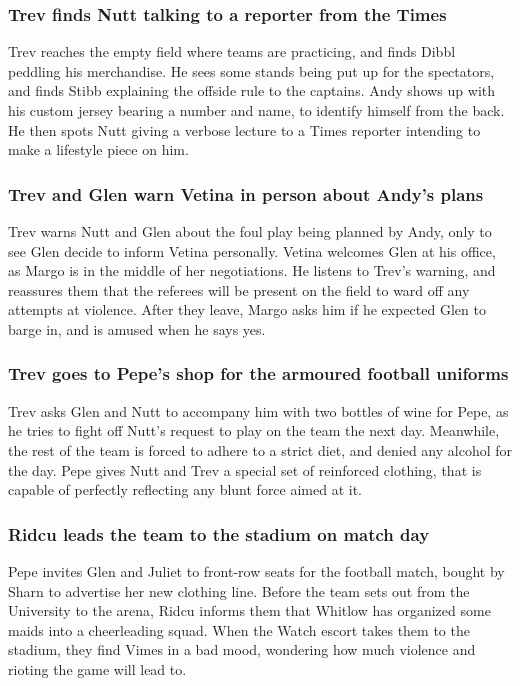 \subsubsection{\Gls{Trev} finds \Gls{Nutt} talking to a reporter from the Times}
\Gls{Trev} reaches the empty field where teams are practicing, and finds \Gls{Dibbl} peddling his
merchandise. He sees some stands being put up for the spectators, and finds \Gls{Stibb} explaining
the offside rule to the captains. \Gls{Andy} shows up with his custom jersey bearing a number and
name, to identify himself from the back. He then spots \Gls{Nutt} giving a verbose lecture to a
Times reporter intending to make a lifestyle piece on him.

\subsubsection{\Gls{Trev} and \Gls{Glen} warn \Gls{Vetina} in person about \Gls{Andy}'s plans}
\Gls{Trev} warns \Gls{Nutt} and \Gls{Glen} about the foul play being planned by \Gls{Andy}, only
to see \Gls{Glen} decide to inform \Gls{Vetina} personally. \Gls{Vetina} welcomes \Gls{Glen} at his
office, as \Gls{Margo} is in the middle of her negotiations. He listens to \Gls{Trev}'s warning, and
reassures them that the referees will be present on the field to ward off any attempts at violence.
After they leave, \Gls{Margo} asks him if he expected \Gls{Glen} to barge in, and is amused when he
says yes.

\subsubsection{\Gls{Trev} goes to \Gls{Pepe}'s shop for the armoured football uniforms}
\Gls{Trev} asks \Gls{Glen} and \Gls{Nutt} to accompany him with two bottles of wine for \Gls{Pepe},
as he tries to fight off \Gls{Nutt}'s request to play on the team the next day. Meanwhile, the
rest of the team is forced to adhere to a strict diet, and denied any alcohol for the day.
\Gls{Pepe} gives \Gls{Nutt} and \Gls{Trev} a special set of reinforced clothing, that is capable of
perfectly reflecting any blunt force aimed at it.

\subsubsection{\Gls{Ridcu} leads the team to the stadium on match day}
\Gls{Pepe} invites \Gls{Glen} and \Gls{Juliet} to front-row seats for the football match, bought by
\Gls{Sharn} to advertise her new clothing line. Before the team sets out from the University to the
arena, \Gls{Ridcu} informs them that \Gls{Whitlow} has organized some maids into a cheerleading
squad. When the Watch escort takes them to the stadium, they find \Gls{Vimes} in a bad mood,
wondering how much violence and rioting the game will lead to.

